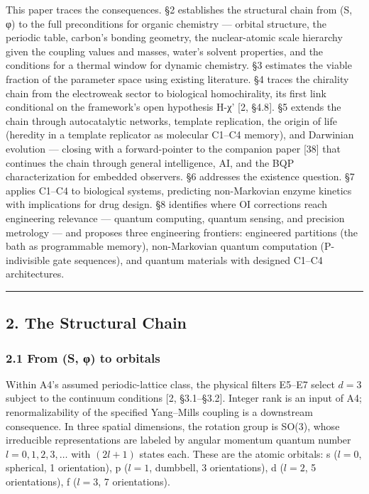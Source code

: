 \documentclass[
]{article}
\begin{document}
This paper traces the consequences. §2 establishes the structural chain
from (S, φ) to the full preconditions for organic chemistry --- orbital
structure, the periodic table, carbon's bonding geometry, the
nuclear-atomic scale hierarchy given the coupling values and masses,
water's solvent properties, and the conditions for a thermal window for
dynamic chemistry. §3 estimates the viable fraction of the parameter
space using existing literature. §4 traces the chirality chain from the
electroweak sector to biological homochirality, its first link
conditional on the framework's open hypothesis H-χ' {[}2, §4.8{]}. §5
extends the chain through autocatalytic networks, template replication,
the origin of life (heredity in a template replicator as molecular
C1--C4 memory), and Darwinian evolution --- closing with a
forward-pointer to the companion paper {[}38{]} that continues the chain
through general intelligence, AI, and the BQP characterization for
embedded observers. §6 addresses the existence question. §7 applies
C1--C4 to biological systems, predicting non-Markovian enzyme kinetics
with implications for drug design. §8 identifies where OI corrections
reach engineering relevance --- quantum computing, quantum sensing, and
precision metrology --- and proposes three engineering frontiers:
engineered partitions (the bath as programmable memory), non-Markovian
quantum computation (P-indivisible gate sequences), and quantum
materials with designed C1--C4 architectures.

\begin{center}\rule{0.5\linewidth}{0.5pt}\end{center}

\hypertarget{the-structural-chain}{%
\subsection{2. The Structural Chain}\label{the-structural-chain}}

\hypertarget{from-s-ux3c6-to-orbitals}{%
\subsubsection{2.1 From (S, φ) to
orbitals}\label{from-s-ux3c6-to-orbitals}}

Within A4's assumed periodic-lattice class, the physical filters E5--E7
select \(d = 3\) subject to the continuum conditions {[}2,
§3.1--§3.2{]}. Integer rank is an input of A4; renormalizability of the
specified Yang--Mills coupling is a downstream consequence. In three
spatial dimensions, the rotation group is SO(3), whose irreducible
representations are labeled by angular momentum quantum number
\(l = 0, 1, 2, 3, \ldots\) with \((2l+1)\) states each. These are the
atomic orbitals: s (\(l = 0\), spherical, 1 orientation), p (\(l = 1\),
dumbbell, 3 orientations), d (\(l = 2\), 5 orientations), f (\(l = 3\),
7 orientations).
\end{document}
